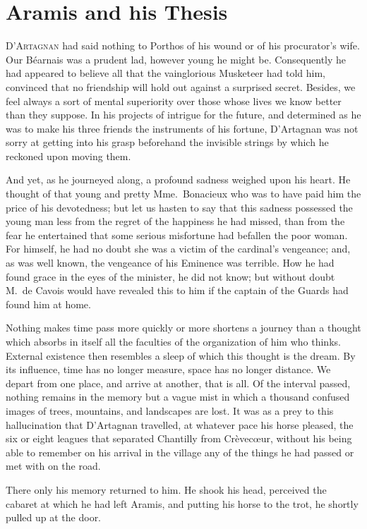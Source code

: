 
\chapter{Aramis and his Thesis} 
	
\lettrine{D}{'Artagnan} had said nothing to Porthos of his wound or of his procurator's wife. Our Béarnais was a prudent lad, however young he might be. Consequently he had appeared to believe all that the vainglorious Musketeer had told him, convinced that no friendship will hold out against a surprised secret. Besides, we feel always a sort of mental superiority over those whose lives we know better than they suppose. In his projects of intrigue for the future, and determined as he was to make his three friends the instruments of his fortune, D'Artagnan was not sorry at getting into his grasp beforehand the invisible strings by which he reckoned upon moving them. 

And yet, as he journeyed along, a profound sadness weighed upon his heart. He thought of that young and pretty Mme.~Bonacieux who was to have paid him the price of his devotedness; but let us hasten to say that this sadness possessed the young man less from the regret of the happiness he had missed, than from the fear he entertained that some serious misfortune had befallen the poor woman. For himself, he had no doubt she was a victim of the cardinal's vengeance; and, as was well known, the vengeance of his Eminence was terrible. How he had found grace in the eyes of the minister, he did not know; but without doubt M.~de Cavois would have revealed this to him if the captain of the Guards had found him at home. 

Nothing makes time pass more quickly or more shortens a journey than a thought which absorbs in itself all the faculties of the organization of him who thinks. External existence then resembles a sleep of which this thought is the dream. By its influence, time has no longer measure, space has no longer distance. We depart from one place, and arrive at another, that is all. Of the interval passed, nothing remains in the memory but a vague mist in which a thousand confused images of trees, mountains, and landscapes are lost. It was as a prey to this hallucination that D'Artagnan travelled, at whatever pace his horse pleased, the six or eight leagues that separated Chantilly from Crèvecœur, without his being able to remember on his arrival in the village any of the things he had passed or met with on the road. 

There only his memory returned to him. He shook his head, perceived the cabaret at which he had left Aramis, and putting his horse to the trot, he shortly pulled up at the door. 

